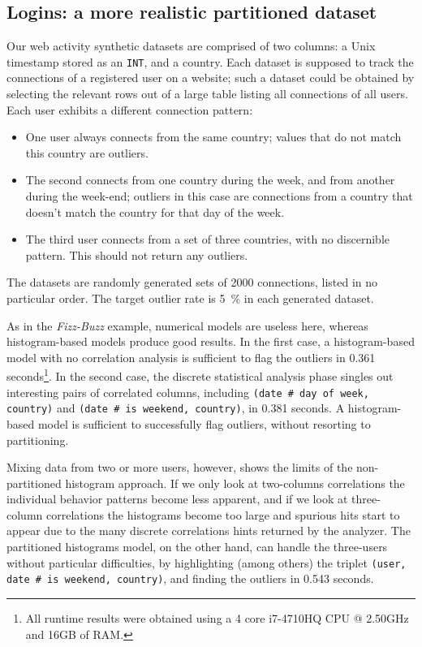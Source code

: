 \subsection{Logins: a more realistic partitioned dataset}

Our web activity synthetic datasets are comprised of two columns: a Unix timestamp stored as an \texttt{INT}, and a country. Each dataset is supposed to track the connections of a registered user on a website; such a dataset could be obtained by selecting the relevant rows out of a large table listing all connections of all users. Each user exhibits a different connection pattern:

\begin{itemize}
\item One user always connects from the same country; values that do not match this country are outliers.
\item The second connects from one country during the week, and from another during the week-end; outliers in this case are connections from a country that doesn't match the country for that day of the week.
\item The third user connects from a set of three countries, with no discernible pattern. This should not return any outliers.
\end{itemize}

The datasets are randomly generated sets of 2000 connections, listed in no particular order. The target outlier rate is \SI{5}{\percent} in each generated dataset.

\newcommand{\prop}[2]{#1\,\#\,#2}

As in the \emph{Fizz-Buzz} example, numerical models are useless here, whereas histogram-based models produce good results. In the first case, a histogram-based model with no correlation analysis is sufficient to flag the outliers in 0.361 seconds\footnote{All runtime results were obtained using a 4 core i7-4710HQ CPU @ 2.50GHz and 16GB of RAM.}. In the second case, the discrete statistical analysis phase singles out interesting pairs of correlated columns, including \texttt{(\prop{date}{day of week}, country)} and \texttt{(\prop{date}{is weekend}, country)}, in 0.381 seconds. A histogram-based model is sufficient to successfully flag outliers, without resorting to partitioning.


Mixing data from two or more users, however, shows the limits of the non-partitioned histogram approach. If we only look at two-columns correlations the individual behavior patterns become less apparent, and if we look at three-column correlations the histograms become too large and spurious hits start to appear due to the many discrete correlations hints returned by the analyzer. The partitioned histograms model, on the other hand, can handle the three-users without particular difficulties, by highlighting (among others) the triplet \texttt{(user, \prop{date}{is weekend}, country)}, and finding the outliers in 0.543 seconds.